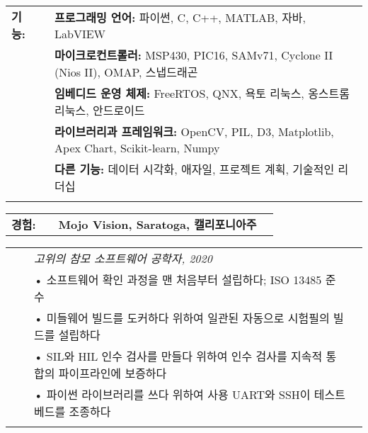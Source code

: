 \documentclass{minimal}
\begin{document}
\begin{CJK*}{UTF8}{}


\begin{center}
\fontsize{14}{12.8}\selectfont
\name\\
\fontsize{10}{12}\selectfont
\address\\
\phone\\
\email\\
\github\\
\end{center}
\vspace{0.5cm}

\begin{tabular}{ p{1.5cm} p{1cm} p{16cm} }
\textbf{기능:} & & \textbf{프로그래밍 언어:} 파이썬, C, C++, MATLAB, 자바, LabVIEW\\
& & \textbf{마이크로컨트롤러:} MSP430, PIC16, SAMv71, Cyclone II (Nios II), OMAP, 스냅드래곤\\
& & \textbf{임베디드 운영 체제:} FreeRTOS, QNX, 욕토 리눅스, 옹스트롬 리눅스, 안드로이드\\
& & \textbf{라이브러리과 프레임워크:} OpenCV, PIL, D3, Matplotlib, Apex Chart, Scikit-learn, Numpy\\
& & \textbf{다른 기능:} 데이터 시각화, 애자일, 프로젝트 계획, 기술적인 리더십\\
& & \\
\end{tabular}

\begin{tabular}{ p{1.5cm} p{1cm} p{16cm} >{\raggedleft\arraybackslash}p{3cm} }
\textbf{경험:} & & \textbf{Mojo Vision, Saratoga, 캘리포니아주} & \\
\end{tabular}

\begin{tabular}{ p{1.5cm} p{1cm} p{16cm} >{\raggedleft\arraybackslash}p{3cm} }
& & \textit{고위의 참모 소프트웨어 공학자, 2020}\\
& & • 소프트웨어 확인 과정을 맨 처음부터 설립하다; ISO 13485 준수\\
& & • 미들웨어 빌드를 도커하다 위하여 일관된 자동으로 시험필의 빌드를 설립하다\\
& & • SIL와 HIL 인수 검사를 만들다 위하여 인수 검사를 지속적 통합의 파이프라인에 보증하다\\
& & • 파이썬 라이브러리를 쓰다 위하여 사용 UART와 SSH이 테스트베드를 조종하다\\
& & \\
\end{tabular}


\end{CJK*}
\end{document}
